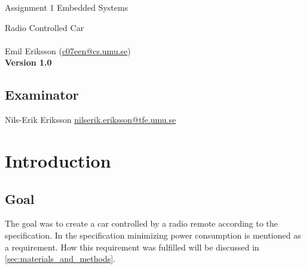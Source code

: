 \documentclass[a4paper,twoside,titlepage]{article}
\makeatletter
\def\author			{Emil Eriksson}
\def\email			{c07een@cs.umu.se}
\def\course			{Embedded Systems}
\def\coursename	{Assignment 1}
\def\delivery		{Report}
\def\version		{1.0}
\def\trivialname	{Radio Controlled Car}
\newcommand{\HUGE}{\fontsize{36}{42}\selectfont{}}
\newcommand{\helvetica}{\fontfamily{phv}\selectfont}
\makeatother
\begin{document}
\pagestyle{empty}
\begin{titlepage}
	{
	\helvetica
	\begin{flushright}
		\small \coursename{} \course\\
	\end{flushright}
	\begin{center}
		\LARGE \trivialname\\
		\HUGE { \textbf{\delivery}} \\
		\small \author{} (\href{mailto:\email}{\email})\\
		\normalsize \textbf{Version \version}\\
		\vspace{155mm}
	\end{center}
	}
	\begin{flushright}
		\subsection*{Examinator}
		Nils-Erik Eriksson \href{mailto:nilserik.eriksson@tfe.umu.se}{nilserik.eriksson@tfe.umu.se}
	\end{flushright}
\end{titlepage}

\pagestyle{fancy}
\tableofcontents
\listoffigures
\newpage


\section{Introduction} %
\label{sec:introduction}

\subsection{Goal} %
\label{sub:goal}

The goal was to create a car controlled by a radio remote according to the specification\cite{spec}. In the specification minimizing power consumption is mentioned as a requirement. How this requirement was fulfilled will be discussed in \autoref{sec:materials_and_methods}.

\end{document}
